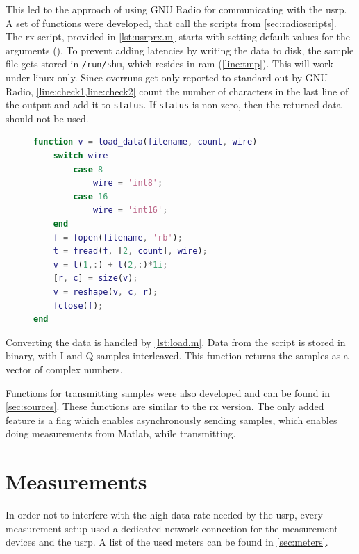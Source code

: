 \documentclass[12pt,a4paper,parskip=full,abstracton]{scrartcl}
\begin{document}
This led to the approach of using GNU Radio for communicating with the \gls{usrp}. A
set of functions were developed, that call the scripts from \cref{sec:radioscripts}.
The \gls{rx} script, provided in \cref{lst:usrprx.m} starts with setting
default values for the arguments (). To prevent
adding latencies by writing the data to disk, the sample file gets stored in
\texttt{/run/shm}, which resides in \gls{ram} (\cref{line:tmp}). This will
work under linux only. Since overruns get only reported to standard out by
GNU Radio, \cref{line:check1,line:check2} count the number of characters in
the last line of the output and add it to \texttt{status}. If \texttt{status}
is non zero, then the returned data should not be used.

\begin{figure}[htb]
    \centering
    \begin{lstlisting}[language=matlab,basicstyle=\tiny,caption={Matlab function for loading data exported by GNU Radio ({\ttfamily load\_data.m)}},label=lst:load.m]
function v = load_data(filename, count, wire)
    switch wire
        case 8
            wire = 'int8';
        case 16
            wire = 'int16';
    end
    f = fopen(filename, 'rb');
    t = fread(f, [2, count], wire);
    v = t(1,:) + t(2,:)*1i;
    [r, c] = size(v);
    v = reshape(v, c, r);
    fclose(f);
end
    \end{lstlisting}
\end{figure}

Converting the data is handled by \cref{lst:load.m}. Data from the script is
stored in binary, with I and Q samples interleaved. This function returns the
samples as a vector of complex numbers.

Functions for transmitting samples were also developed and can be found in
\cref{sec:sources}. These functions are similar to the \gls{rx} version. The
only added feature is a flag which enables asynchronously sending samples,
which enables doing measurements from Matlab, while transmitting.

\section{Measurements}
\label{sec:measurements}
In order not to interfere with the high data rate needed by the \gls{usrp},
every measurement setup used a dedicated network connection for the measurement
devices and the \gls{usrp}. A list of the used meters can be found in \cref{sec:meters}.
\end{document}
